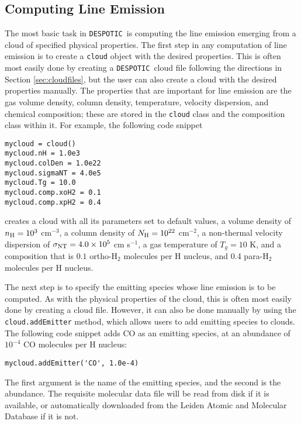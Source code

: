 \documentclass[12pt]{article}
\newcommand{\despotic}{\texttt{DESPOTIC}}
\begin{document}
\subsection{Computing Line Emission}

The most basic task in \despotic\ is computing the line emission emerging from a cloud of specified physical properties. The first step in any computation of line emission is to create a \verb=cloud= object with the desired properties. This is often most easily done by creating a \despotic\ cloud file following the directions in Section \ref{sec:cloudfiles}, but the user can also create a cloud with the desired properties manually. The properties that are important for line emission are the gas volume density, column density, temperature, velocity dispersion, and chemical composition; these are stored in the \verb=cloud= class and the composition class within it. For example, the following code snippet
\begin{verbatim}
mycloud = cloud()
mycloud.nH = 1.0e3
mycloud.colDen = 1.0e22
mycloud.sigmaNT = 4.0e5
mycloud.Tg = 10.0
mycloud.comp.xoH2 = 0.1
mycloud.comp.xpH2 = 0.4
\end{verbatim}
creates a cloud with all its parameters set to default values, a volume density of $n_{\rm H} = 10^3$ cm$^{-3}$, a column density of $N_{\rm H} = 10^{22}$ cm$^{-2}$, a non-thermal velocity dispersion of $\sigma_{\rm NT} = 4.0\times 10^5$ cm s$^{-1}$, a gas temperature of $T_g = 10$ K, and a composition that is $0.1$ ortho-H$_2$ molecules per H nucleus, and 0.4 para-H$_2$ molecules per H nucleus.

The next step is to specify the emitting species whose line emission is to be computed. As with the physical properties of the cloud, this is often most easily done by creating a cloud file. However, it can also be done manually by using the \verb=cloud.addEmitter= method, which allows users to add emitting species to clouds. The following code snippet adds CO as an emitting species, at an abundance of $10^{-4}$ CO molecules per H nucleus:
\begin{verbatim}
mycloud.addEmitter('CO', 1.0e-4)
\end{verbatim}
The first argument is the name of the emitting species, and the second is the abundance. The requisite molecular data file will be read from disk if it is available, or automatically downloaded from the Leiden Atomic and Molecular Database if it is not.
\end{document}

